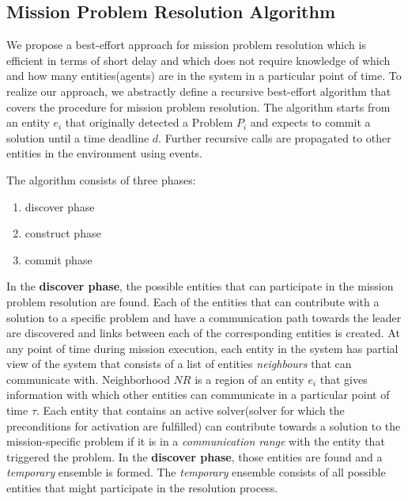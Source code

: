 \documentclass[journal]{IEEEtran}
\theoremstyle{definition}
\begin{document}
\subsection{Mission Problem Resolution Algorithm}









We propose a best-effort approach for mission problem resolution which is efficient in terms of short delay and which does not require knowledge of which and how many entities(agents) are in the system in a particular point of time.
To realize our approach, we abstractly define a recursive best-effort algorithm that covers the procedure for mission problem resolution.
The algorithm starts from an entity $e_i$ that originally detected a Problem $P_i$ and expects to commit a solution until a time deadline $d$.
Further recursive calls are propagated to other entities in the environment using events.

The algorithm consists of three phases:
\begin{enumerate}
\item discover phase 
\item construct phase
\item commit phase
\end{enumerate}
 
 In the \textbf{discover phase},  %
 the possible entities that can participate in the mission problem resolution are found. Each of the entities that can contribute with a solution to a specific problem and have a communication path towards 
 the leader are discovered and links between each of the corresponding entities is created. 
 At any point of time during mission execution, each entity in the system has partial view of the system that consists of a list of entities \textit{neighbours} that can communicate with. Neighborhood $NR$ is a region of an entity $e_i$ that gives information with which other entities can communicate in a particular point of time $\tau$.
 Each entity that contains an active solver(solver for which the preconditions for activation are fulfilled) %
 can contribute towards a solution to the mission-specific problem if it is in a \textit{communication range} with the entity that triggered the problem. In the \textbf{discover phase}, those entities are found
 and a \textit{temporary} ensemble is formed. The \textit{temporary} ensemble consists of all possible entities that might participate in the resolution process.
 
\end{document}
